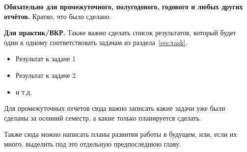 
\textbf{Обязательно для промежуточного, полугодового, годового и  любых других отчётов.} Кратко, что было сделано.

\textbf{Для практик/ВКР.} Также важно сделать список результатов, который будет один к одному соответствовать задачам из раздела~\ref{sec:task}.

\begin{itemize}
\item Результат к задаче 1 
\item Результат к задаче 2
\item и т.д.
\end{itemize}
\noindent Для промежуточных отчетов сюда важно записать какие задачи уже были сделаны за осенний семестр, а какие только планируется сделать.

Также сюда можно написать планы развития работы в будущем, или, если их много, выделить под это отдельную предпоследнюю главу.

